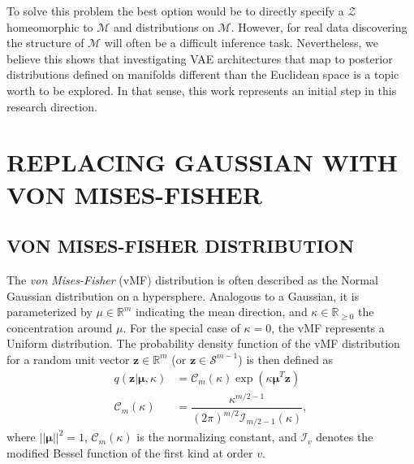\documentclass[letterpaper]{article}
\newcommand{\z}{\mathbf{z}}
\begin{document}
To solve this problem the best option would be to directly specify a $\mathcal{Z}$ homeomorphic to $\mathcal{M}$ and distributions on $\mathcal{M}$. However, for real data discovering the structure of $\mathcal{M}$ will often be a difficult inference task. Nevertheless, we believe this shows that investigating VAE architectures that map to posterior distributions defined on manifolds different than the Euclidean space is a topic worth to be explored. In that sense, this work represents an initial step in this research direction. 

\section{REPLACING GAUSSIAN WITH VON MISES-FISHER}
\subsection{VON MISES-FISHER DISTRIBUTION}\label{subsec:vMF}

The \textit{von Mises-Fisher} (vMF) distribution is often described as the Normal Gaussian distribution on a hypersphere. Analogous to a Gaussian, it is parameterized by $\mu\in\mathbb{R}^{m}$ indicating the mean direction, and $\kappa\in\mathbb{R}_{\geq0}$ the concentration around $\mu$. For the special case of $\kappa = 0$, the vMF represents a Uniform distribution. The probability density function of the vMF distribution for a random unit vector $\z \in \mathbb{R}^{m}$ (or $\z \in \mathcal{S}^{m-1}$) is then defined as
\begin{align}
    q(\z|\mathbf{\mu}, \kappa) &=  \mathcal{C}_m(\kappa)\exp{(\kappa \mathbf{\mu}^T\z)} \label{vMF-def}\\
    \mathcal{C}_m(\kappa) &= \dfrac{\kappa^{m/2 - 1}}{(2\pi)^{m/2}\mathcal{I}_{m/2 - 1}(\kappa)}, \label{eq-norm-c}
\end{align}
where $||\mathbf{\mu}||^2 = 1$, $\mathcal{C}_m(\kappa)$ is the normalizing constant, and $\mathcal{I}_v$ denotes the modified Bessel function of the first kind at order $v$.
\end{document}
